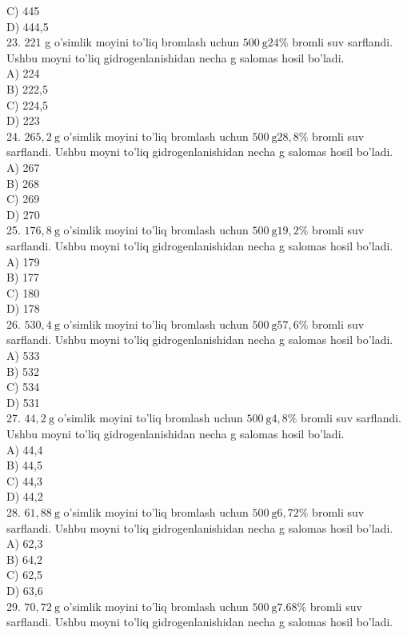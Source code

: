 C) 445\\
D) 444,5\\
23. 221 g o'simlik moyini to'liq bromlash uchun $500 \mathrm{~g} 24 \%$ bromli suv sarflandi. Ushbu moyni to'liq gidrogenlanishidan necha g salomas hosil bo'ladi.\\
A) 224\\
B) 222,5\\
C) 224,5\\
D) 223\\
24. $265,2 \mathrm{~g}$ o'simlik moyini to'liq bromlash uchun $500 \mathrm{~g} 28,8 \%$ bromli suv sarflandi. Ushbu moyni to'liq gidrogenlanishidan necha g salomas hosil bo'ladi.\\
A) 267\\
B) 268\\
C) 269\\
D) 270\\
25. $176,8 \mathrm{~g}$ o'simlik moyini to'liq bromlash uchun $500 \mathrm{~g} 19,2 \%$ bromli suv sarflandi. Ushbu moyni to'liq gidrogenlanishidan necha g salomas hosil bo'ladi.\\
A) 179\\
B) 177\\
C) 180\\
D) 178\\
26. $530,4 \mathrm{~g}$ o'simlik moyini to'liq bromlash uchun $500 \mathrm{~g} 57,6 \%$ bromli suv sarflandi. Ushbu moyni to'liq gidrogenlanishidan necha g salomas hosil bo'ladi.\\
A) 533\\
B) 532\\
C) 534\\
D) 531\\
27. $44,2 \mathrm{~g}$ o'simlik moyini to'liq bromlash uchun $500 \mathrm{~g} 4,8 \%$ bromli suv sarflandi. Ushbu moyni to'liq gidrogenlanishidan necha g salomas hosil bo'ladi.\\
A) 44,4\\
B) 44,5\\
C) 44,3\\
D) 44,2\\
28. $61,88 \mathrm{~g}$ o'simlik moyini to'liq bromlash uchun $500 \mathrm{~g} 6,72 \%$ bromli suv sarflandi.
Ushbu moyni to'liq gidrogenlanishidan necha g salomas hosil bo'ladi.\\
A) 62,3\\
B) 64,2\\
C) 62,5\\
D) 63,6\\
29. $70,72 \mathrm{~g}$ o'simlik moyini to'liq bromlash uchun $500 \mathrm{~g} 7.68 \%$ bromli suv sarflandi. Ushbu moyni to'liq gidrogenlanishidan necha g salomas hosil bo'ladi.\\
